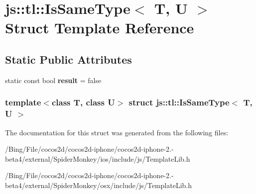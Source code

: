\hypertarget{structjs_1_1tl_1_1_is_same_type}{\section{js\-:\-:tl\-:\-:Is\-Same\-Type$<$ T, U $>$ Struct Template Reference}
\label{structjs_1_1tl_1_1_is_same_type}
}
\subsection*{Static Public Attributes}
\begin{DoxyCompactItemize}
\item 
\hypertarget{structjs_1_1tl_1_1_is_same_type_ac986caeff737dcfdf003c39055d38b49}{static const bool {\bfseries result} = false}\label{structjs_1_1tl_1_1_is_same_type_ac986caeff737dcfdf003c39055d38b49}

\end{DoxyCompactItemize}
\subsubsection*{template$<$class T, class U$>$ struct js\-::tl\-::\-Is\-Same\-Type$<$ T, U $>$}



The documentation for this struct was generated from the following files\-:\begin{DoxyCompactItemize}
\item 
/\-Bing/\-File/cocos2d/cocos2d-\/iphone/cocos2d-\/iphone-\/2.-\/beta4/external/\-Spider\-Monkey/ios/include/js/Template\-Lib.\-h\item 
/\-Bing/\-File/cocos2d/cocos2d-\/iphone/cocos2d-\/iphone-\/2.-\/beta4/external/\-Spider\-Monkey/osx/include/js/Template\-Lib.\-h\end{DoxyCompactItemize}
